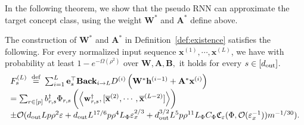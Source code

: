 In the following theorem, we show that the pseudo RNN can approximate the target concept class, using the weight $\mathbf{W}^{*}$ and $\mathbf{A}^{\ast}$ define above.
\begin{theorem}\label{thm:existence_pseudo}
	The construction of $\mathbf{W}^{*}$ and $\mathbf{A}^{\ast}$ in Definition~\ref{def:existence} satisfies the following. For every normalized input sequence $\mathbf{x}^{(1)}, \cdots, \mathbf{x}^{(L)}$, we have with probability at least $1-e^{-\Omega\left(\rho^{2}\right)}$ over $\mathbf{W}, \mathbf{A}, \mathbf{B},$ it holds for every $s \in [d_{\mathrm{out}} ]$.
	$$
	\begin{array}{l}
		F_{s}^{(L)} \stackrel{\text { def }}{=} \sum_{i=1}^{L} \mathbf{e}_{s}^{\top} \mathbf{Back}_{i \rightarrow L} D^{(i)} \left(\mathbf{W}^{\ast} \mathbf{h}^{(i-1)} + \mathbf{A}^{\ast} \mathbf{x}^{(i)}\right) \\
		= \sum_{r \in[p]} b_{r, s}^{\dagger} \Phi_{r, s} \left(\left\langle  \mathbf{w}_{r, s}^{\dagger}, [\overline{\mathbf{x}}^{(2)}, \cdots, \overline{\mathbf{x}}^{(L-2)}]\right\rangle\right)\\ \pm \mathcal{O}(d_{\mathrm{out}} Lp\rho^2 \varepsilon + d_{\mathrm{out}} L^{17/6} p \rho^4 L_{\Phi} \varepsilon_x^{2/3} + d_{\mathrm{out}} ^{3/2}L^5 p \rho^{11} L_{\Phi} C_{\Phi}  \mathfrak{C}_{\varepsilon}(\Phi, \mathcal{O}(\varepsilon_x^{-1}))  m^{-1/30} ).
	\end{array}
	$$

\end{theorem}
